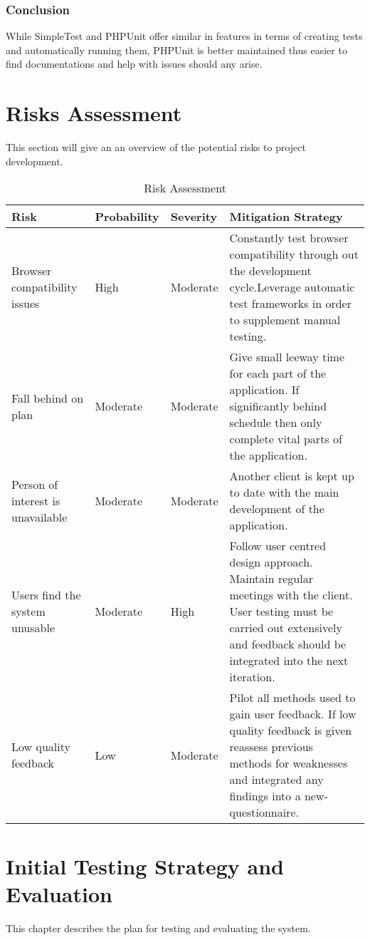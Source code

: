 \documentclass[a4paper,oneside,11pt]{report}
\begin{document}
\subsection{Conclusion}
While SimpleTest and PHPUnit offer similar in features in terms of creating tests and automatically running them, PHPUnit is better maintained thus easier to find documentations and help with issues should any arise. 


\chapter{Risks Assessment}
 	This section will give an an overview of the potential risks to project development.
\begin{center}
	\begin{table}[!ht]
    \begin{tabular}[ht]{| l | l | l | p{5cm} |}
    \hline
    Risk & Probability & Severity & Mitigation Strategy \\ 
    \hline
    Browser compatibility issues & High & Moderate & Constantly test browser compatibility through out the development cycle.Leverage automatic test frameworks in order to supplement manual testing.\\ \hline
    Fall behind on plan & Moderate & Moderate & Give small leeway time for each part of the application. If significantly behind schedule then only complete vital parts of the application.  \\ \hline
    Person of interest is unavailable & Moderate & Moderate &  Another client is kept up to date with the main development of the application.\\ 
    \hline
Users find the system unusable & Moderate & High & Follow user centred design approach. Maintain regular meetings with the client. User testing must be carried out extensively and feedback should be integrated into the next iteration. \\ 
    \hline
    Low quality feedback & Low & Moderate & Pilot all methods used to gain user feedback. If low quality feedback is given reassess previous methods for weaknesses and integrated any findings into a new- questionnaire. \\ 
    \hline
    
    \end{tabular}
    \caption{Risk Assessment}
\label{tab:xyz}
    \end{table}
    \clearpage
    \end{center}
\chapter{Initial Testing Strategy and Evaluation}
This chapter describes the plan for testing and evaluating the system.
\end{document}
